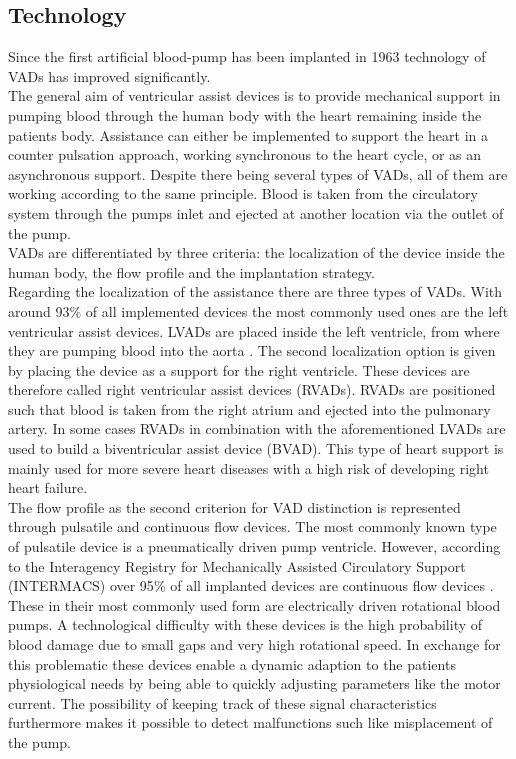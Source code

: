 \subsection{Technology}
Since the first artificial blood-pump has been implanted in 1963 \cite{VAD9} technology of VADs has improved significantly.
\\The general aim of ventricular assist devices is to provide mechanical support in pumping blood through the human body with the heart remaining inside the patients body. Assistance can either be implemented to support the heart in a counter pulsation approach, working synchronous to the heart cycle, or as an asynchronous support. Despite there being several types of VADs, all of them are working according to the same principle. Blood is taken from the circulatory system through the pumps inlet and ejected at another location via the outlet of the pump.\cite{VAD1}
\\VADs are differentiated by three criteria: the localization of the device inside the human body, the flow profile and the implantation strategy.
\\Regarding the localization of the assistance there are three types of VADs. With around 93{\%} of all implemented devices the most commonly used ones are the left ventricular assist devices.\cite{VAD7} LVADs are placed inside the left ventricle, from where they are pumping blood into the aorta \cite{VAD4}. The second localization option is given by placing the device as a support for  the right ventricle. These devices are therefore called right ventricular assist devices (RVADs). RVADs are positioned such that blood is taken from the right atrium and ejected into the pulmonary artery. \cite{VAD7} In some cases RVADs in combination with the aforementioned LVADs are used to build a biventricular assist device (BVAD). This type of heart support is mainly used for more severe heart diseases with a high risk of developing right heart failure. \cite{VAD11}
\\The flow profile as the second criterion for VAD distinction is represented through pulsatile and continuous flow devices. The most commonly known type of pulsatile device is a pneumatically driven pump ventricle. \cite{VAD1}
However, according to the Interagency Registry for Mechanically Assisted Circulatory Support (INTERMACS) over 95{\%} of all implanted devices are continuous flow devices \cite{VAD8}. These in their most commonly used form are electrically driven rotational blood pumps. A technological difficulty with these devices is the high probability of blood damage due to small gaps and very high rotational speed. In exchange for this problematic these devices enable a dynamic adaption to the patients physiological needs by being able to quickly adjusting parameters like the motor current. The possibility of keeping track of these signal characteristics furthermore makes it possible to detect malfunctions such like misplacement of the pump. \cite{VAD1}
